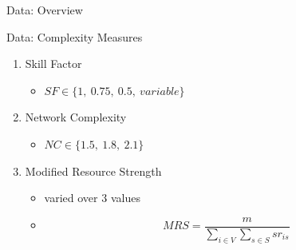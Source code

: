 \documentclass{beamer}
\begin{document}
\begin{frame}{Data: Overview}
\end{frame}

\begin{frame}{Data: Complexity Measures}
	\begin{enumerate}
		\item Skill Factor
		\vspace{1mm}
		\begin{itemize}
			\item $SF \in \{1,~0.75,~0.5,~variable\}$\pause
		\end{itemize}
		\vspace{2mm}
		\item Network Complexity
		\vspace{1mm}
		\begin{itemize}
			\item $NC \in \{1.5,~1.8,~2.1\}$\pause
		\end{itemize}
		\vspace{2mm}
		\item Modified Resource Strength
		\vspace{1mm}
		\begin{itemize}
			\item varied over 3 values
			\item \[MRS=\frac{m}{\sum_{i\in V}\sum_{s \in S}sr_{is}}\]
		\end{itemize}
	\end{enumerate}
\end{frame}
\end{document}
